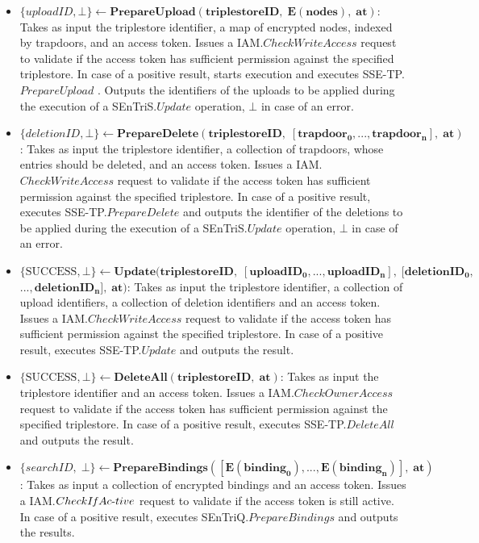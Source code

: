 \begin{definition}
\begin{itemize}
        \item $\{uploadID, \bot\} \leftarrow \mathbf{PrepareUpload(triplestoreID, \; E(nodes), \; at)}$: Takes as input the triplestore identifier, a map of encrypted nodes, indexed by trapdoors, and an access token. Issues a IAM.$CheckWriteAccess$ request to validate if the access token has sufficient permission against the specified triplestore. In case of a positive result, starts execution and executes SSE-TP.$PrepareUpload$ . Outputs the identifiers of the uploads to be applied during the execution of a SEnTriS.$Update$ operation, $\bot$ in case of an error.

        \item $\{deletionID, \bot\} \leftarrow \mathbf{PrepareDelete(triplestoreID, \; [trapdoor_0, ..., trapdoor_n], \; at)}$: \linebreak Takes as input the triplestore identifier, a collection of trapdoors, whose entries should be deleted, and an access token. Issues a IAM.$CheckWriteAccess$ request to validate if the access token has sufficient permission against the specified triplestore. In case of a positive result, executes SSE-TP.$PrepareDelete$ and outputs the identifier of the deletions to be applied during the execution of a SEnTriS.$Update$ operation, $\bot$ in case of an error.

        \item $\{\textrm{SUCCESS}, \bot\} \leftarrow \mathbf{Update(triplestoreID, \; [uploadID_0, ..., uploadID_n], \; [deletionID_0,}$ \linebreak $\mathbf{ ..., deletionID_n], \; at)}$: Takes as input the triplestore identifier, a collection of upload identifiers, a collection of deletion identifiers and an access token. Issues a IAM.$CheckWriteAccess$ request to validate if the access token has sufficient permission against the specified triplestore. In case of a positive result, executes SSE-TP.$Update$ and outputs the result.

        \item $\{\textrm{SUCCESS}, \bot\} \leftarrow \mathbf{DeleteAll(triplestoreID, \; at)}$: Takes as input the triplestore identifier and an access token. Issues a IAM.$CheckOwnerAccess$ request to validate if the access token has sufficient permission against the specified triplestore. In case of a positive result, executes SSE-TP.$DeleteAll$ and outputs the result.


        \item $\{ searchID, \; \bot \} \leftarrow \mathbf{PrepareBindings([E(binding_0),...,E(binding_n)], \; at)}$: Takes as input a collection of encrypted bindings and an access token. Issues a IAM.$CheckI\textrm{\emph{f}}Ac\textrm{-}\linebreak tive$ request to validate if the access token is still active. In case of a positive result, executes SEnTriQ.$PrepareBindings$ and outputs the results.


\end{itemize}
\end{definition}
